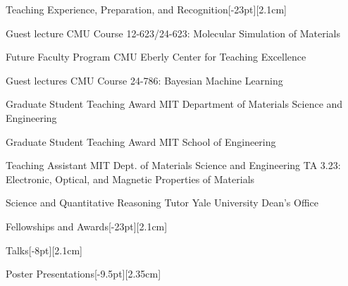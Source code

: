 \documentclass{cv} %
\begin{document}
\vspace{-2mm}
\begin{cvSection}{Teaching Experience, Preparation, and Recognition}[-23pt][2.1cm]

    {Guest lecture}
    {CMU Course 12-623/24-623: Molecular Simulation of Materials}
    {}

    \cvItem{}
    {Future Faculty Program}
    {CMU Eberly Center for Teaching Excellence}
    {}

    \cvItem{}
    {Guest lectures}
    {CMU Course 24-786: Bayesian Machine Learning}
    {}
  
    {Graduate Student Teaching Award}
    {MIT Department of Materials Science and Engineering}
    {}

    \cvItem{}
    {Graduate Student Teaching Award}
    {MIT School of Engineering}
    {}
  
    {Teaching Assistant}
    {MIT Dept. of Materials Science and Engineering}
    {\vspace{14pt}TA 3.23: Electronic, Optical, and Magnetic Properties of Materials}

    {Science and Quantitative Reasoning Tutor}
    {Yale University Dean's Office}
    {}

\end{cvSection}

\begin{cvSection}{Fellowships and Awards}[-23pt][2.1cm]
    
\end{cvSection}

\begin{pubsSection}[-8pt][2.1cm]
    
\end{pubsSection}

\begin{cvSection}{Talks}[-8pt][2.1cm]
    
\end{cvSection}

\newpage
\begin{cvSection}{Poster Presentations}[-9.5pt][2.35cm]
    
\end{cvSection}
\end{document}
